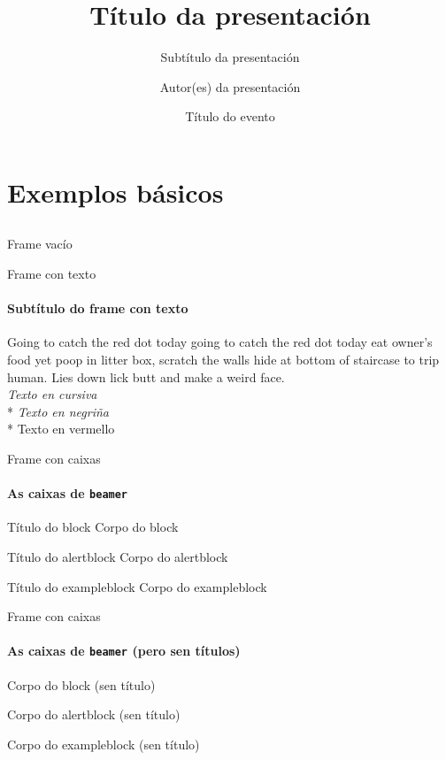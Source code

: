 \documentclass[11pt,aspectratio=169]{beamer}
\title{Título da presentación}
\subtitle{Subtítulo da presentación}
\author{Autor(es) da presentación}
\institute{\CITIUS\\ Universidade de Santiago de Compostela}
\date%
  [Título do evento (aparece nos frames)]%
  {Título do evento}
\begin{document}
\titleslides

\tocslides


\section{Exemplos básicos}
\subsection*{}

\begin{frame}{Frame vacío}{}
\end{frame}


\begin{frame}{Frame con texto}
\framesubtitle{Subtítulo do frame con texto}
 Going to catch the red dot today going to catch the red dot today eat owner's
 food yet poop in litter box, scratch the walls hide at bottom of staircase to
 trip human. Lies down lick butt and make a weird face.\\
 \textit{Texto en cursiva}\\*
 \emph{Texto en negriña}\\*
 \alert{Texto en vermello}
\end{frame}


\begin{frame}{Frame con caixas}
\framesubtitle{As caixas de \texttt{beamer}}

 \begin{block}{Título do block}
   Corpo do block
 \end{block}
 \begin{alertblock}{Título do alertblock}
   Corpo do alertblock
 \end{alertblock}
 \begin{exampleblock}{Título do exampleblock}
   Corpo do exampleblock
 \end{exampleblock}

\end{frame}


\begin{frame}{Frame con caixas}
\framesubtitle{As caixas de \texttt{beamer} (pero sen títulos)}

 \begin{block}{}
   Corpo do block (sen título)
 \end{block}
 \begin{alertblock}{}
   Corpo do alertblock (sen título)
 \end{alertblock}
 \begin{exampleblock}{}
   Corpo do exampleblock (sen título)
 \end{exampleblock}

\end{frame}
\end{document}
